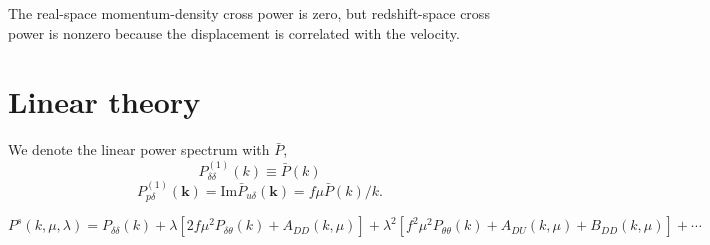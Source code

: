 \documentclass[a4paper,11pt, fleqn]{article}
\begin{document}
The real-space momentum-density cross power is zero, but
redshift-space cross power is nonzero because the displacement is
correlated with the velocity.



\clearpage
\section{Linear theory}

We denote the linear power spectrum with $\bar{P}$,
\begin{equation}
  P_{\delta\delta}^{(1)}(k) \equiv \bar{P}(k)
\end{equation}
\begin{equation}
  P_{p\delta}^{(1)}(\bm{k}) = \mathrm{Im} \bar{P}_{u\delta}(\bm{k})
  = f\mu \bar{P}(k)/k.
\end{equation}

\begin{equation}
  P^{s}(k, \mu, \lambda) = P_{\delta\delta}(k) + \lambda \left[
    2f\mu^2 P_{\delta \theta}(k) + A_{DD}(k, \mu) \right]
  + \lambda^2 \left[
    f^2 \mu^2 P_{\theta\theta}(k) + A_{DU}(k, \mu) + B_{DD}(k, \mu) \right]
  + \cdots
\end{equation}
\end{document}
